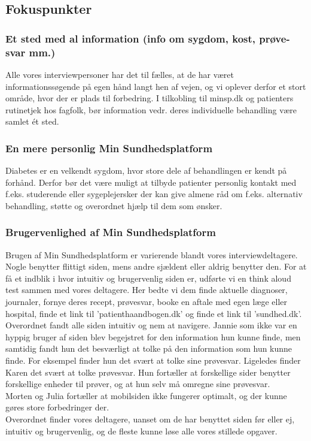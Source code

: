 \subsection{Fokuspunkter}
\subsubsection{Et sted med al information (info om sygdom, kost, prøve-svar mm.)}
Alle vores interviewpersoner har det til fælles, at de har været informationssøgende på egen hånd langt hen af vejen, og vi oplever derfor et stort område, hvor der er plads til forbedring. I tilkobling til minsp.dk og patienters rutinetjek hos fagfolk, bør information vedr. deres individuelle behandling være samlet ét sted.

\subsubsection{En mere personlig Min Sundhedsplatform}
Diabetes er en velkendt sygdom, hvor store dele af behandlingen er kendt på forhånd. Derfor bør det være muligt at tilbyde patienter personlig kontakt med f.eks. studerende eller sygeplejersker der kan give almene råd om f.eks. alternativ behandling, støtte og overordnet hjælp til dem som ønsker.

\subsubsection{Brugervenlighed af Min Sundhedsplatform}
Brugen af Min Sundhedsplatform er varierende blandt vores interviewdeltagere. Nogle benytter flittigt siden, mens andre sjældent eller aldrig benytter den. For at få et indblik i hvor intuitiv og brugervenlig siden er, udførte vi en think aloud test sammen med vores deltagere. Her bedte vi dem finde aktuelle diagnoser, journaler, fornye deres recept, prøvesvar, booke en aftale med egen læge eller hospital, finde et link til 'patienthaandbogen.dk' og finde et link til 'sundhed.dk'. Overordnet fandt alle siden intuitiv og nem at navigere. Jannie som ikke var en hyppig bruger af siden blev begejstret for den information hun kunne finde, men samtidig fandt hun det besværligt at tolke på den information som hun kunne finde. For eksempel finder hun det svært at tolke sine prøvesvar. Ligeledes finder Karen det svært at tolke prøvesvar. Hun fortæller at forskellige sider benytter forskellige enheder til prøver, og at hun selv må omregne sine prøvesvar.\\
Morten og Julia fortæller at mobilsiden ikke fungerer optimalt, og der kunne gøres store forbedringer der.\\
Overordnet finder vores deltagere, uanset om de har benyttet siden før eller ej, intuitiv og brugervenlig, og de fleste kunne løse alle vores stillede opgaver.


